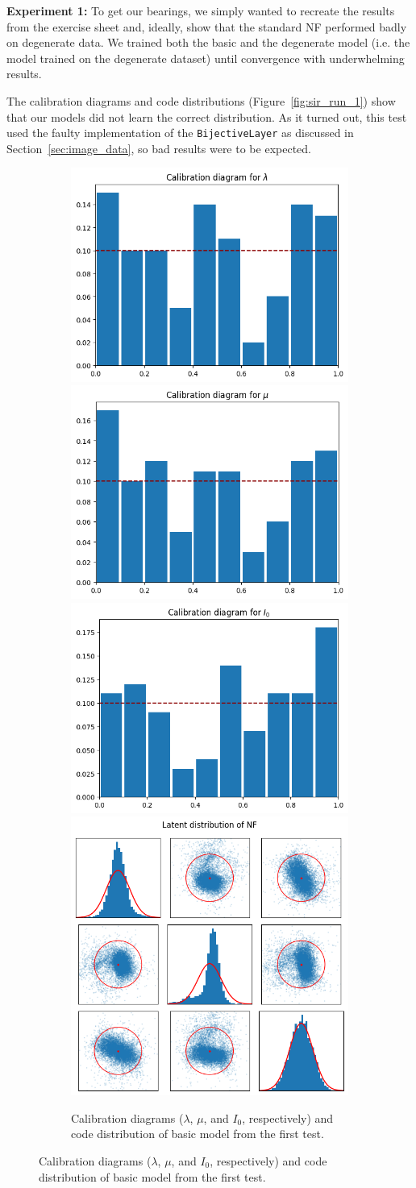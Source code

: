 \textbf{Experiment 1:} To get our bearings, we simply wanted to recreate the results from the exercise sheet and, ideally, show that the standard NF performed badly on degenerate data. We trained both the basic and the degenerate model (i.e. the model trained on the degenerate dataset) until convergence with underwhelming results.

The calibration diagrams and code distributions (Figure~\ref{fig:sir_run_1}) show that our models did not learn the correct distribution. As it turned out, this test used the faulty implementation of the \texttt{BijectiveLayer} as discussed in Section~\ref{sec:image_data}, so bad results were to be expected.

\begin{figure}[t]
\centering
\begin{subfigure}{\textwidth}
    \includegraphics[width=.23\textwidth]{images/sbi_sir/run_1/basic calib lambda.png}
    \includegraphics[width=.23\textwidth]{images/sbi_sir/run_1/basic calib mu.png}
    \includegraphics[width=.23\textwidth]{images/sbi_sir/run_1/basic calib I_0.png}
    \includegraphics[width=.23\textwidth]{images/sbi_sir/run_1/basic code distribution.png}
    \caption{Calibration diagrams ($\lambda$, $\mu$, and $I_0$, respectively) and code distribution of basic model from the first test.}
\end{subfigure}


\end{figure}
